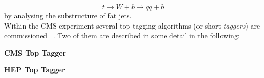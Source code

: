 \begin{equation}
 t \rightarrow W + b \rightarrow q\bar{q} + b 
\end{equation} 
by analysing the substructure of fat jets. \\ 
Within the CMS experiment several top tagging algorithms (or short \textit{taggers}) are commissioned~\cite{CMS:2014fya} . Two of them are described in some detail in the following:
\begin{description}
 \item \textbf{CMS Top Tagger}
 \item \textbf{HEP Top Tagger}
\end{description}



